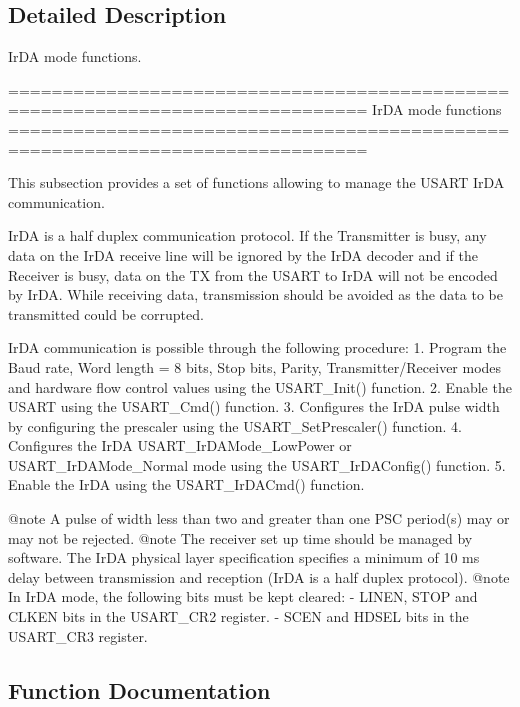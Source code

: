 \subsection{Detailed Description}
Ir\+DA mode functions. 

\begin{DoxyVerb} ===============================================================================
                                IrDA mode functions
 ===============================================================================  

  This subsection provides a set of functions allowing to manage the USART 
  IrDA communication.
  
  IrDA is a half duplex communication protocol. If the Transmitter is busy, any data
  on the IrDA receive line will be ignored by the IrDA decoder and if the Receiver 
  is busy, data on the TX from the USART to IrDA will not be encoded by IrDA.
  While receiving data, transmission should be avoided as the data to be transmitted
  could be corrupted.

  IrDA communication is possible through the following procedure:
     1. Program the Baud rate, Word length = 8 bits, Stop bits, Parity, Transmitter/Receiver 
        modes and hardware flow control values using the USART_Init() function.
     2. Enable the USART using the USART_Cmd() function.
     3. Configures the IrDA pulse width by configuring the prescaler using  
        the USART_SetPrescaler() function.
     4. Configures the IrDA  USART_IrDAMode_LowPower or USART_IrDAMode_Normal mode
        using the USART_IrDAConfig() function.
     5. Enable the IrDA using the USART_IrDACmd() function.

@note A pulse of width less than two and greater than one PSC period(s) may or may
      not be rejected.
@note The receiver set up time should be managed by software. The IrDA physical layer
      specification specifies a minimum of 10 ms delay between transmission and 
      reception (IrDA is a half duplex protocol).
@note In IrDA mode, the following bits must be kept cleared:
        - LINEN, STOP and CLKEN bits in the USART_CR2 register.
        - SCEN and HDSEL bits in the USART_CR3 register.\end{DoxyVerb}
 

\subsection{Function Documentation}
\mbox{\label{group___u_s_a_r_t___group7_gabff56ebb494fdfadcc6ef4fe9ac8dd24}} 
